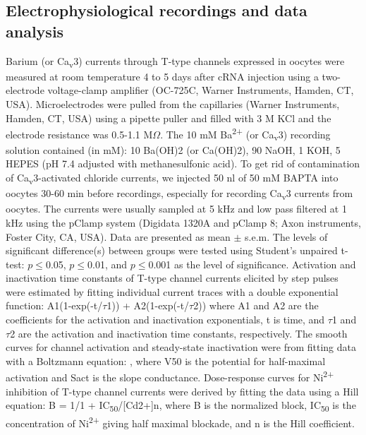 \subsection*{Electrophysiological recordings and data analysis}

Barium (or Ca\textsubscript{v}3) currents through T-type channels expressed in oocytes were measured at room temperature 4 to 5 days after cRNA injection using a two-electrode voltage-clamp amplifier (OC-725C, Warner Instruments, Hamden, CT, USA).
Microelectrodes were pulled from the capillaries (Warner Instruments, Hamden, CT, USA) using a pipette puller and filled with 3 M KCl and the electrode resistance was 0.5-1.1 M$\Omega$.
The 10 mM Ba\textsuperscript{2+} (or Ca\textsubscript{v}3) recording solution contained (in mM): 10 Ba(OH)2 (or Ca(OH)2), 90 NaOH, 1 KOH, 5 HEPES (pH 7.4 adjusted with methanesulfonic acid).
To get rid of contamination of Ca\textsubscript{v}3-activated chloride currents, we injected 50 nl of 50 mM BAPTA into oocytes 30-60 min before recordings, especially for recording Ca\textsubscript{v}3 currents from oocytes.
The currents were usually sampled at 5 kHz and low pass filtered at 1 kHz using the pClamp system (Digidata 1320A and pClamp 8; Axon instruments, Foster City, CA, USA).
Data are presented as mean $\pm$ s.e.m.
The levels of significant difference(s) between groups were tested using Student's unpaired t-test: $p\le$0.05, $p\le$0.01, and $p\le$0.001 as the level of significance.
Activation and inactivation time constants of T-type channel currents elicited by step pulses were estimated by fitting individual current traces with a double exponential function: A1(1-exp(-t/$\tau$1)) + A2(1-exp(-t/$\tau$2)) where A1 and A2 are the coefficients for the activation and inactivation exponentials, t is time, and $\tau$1 and $\tau$2 are the activation and inactivation time constants, respectively.
The smooth curves for channel activation and steady-state inactivation were from fitting data with a Boltzmann equation: , where V50 is the potential for half-maximal activation and Sact is the slope conductance.
Dose-response curves for Ni\textsuperscript{2+} inhibition of T-type channel currents were derived by fitting the data using a Hill equation: B = 1/{1 + IC\textsubscript{50}/[Cd2+]n}, where B is the normalized block, IC\textsubscript{50} is the concentration of Ni\textsuperscript{2+} giving half maximal blockade, and n is the Hill coefficient.